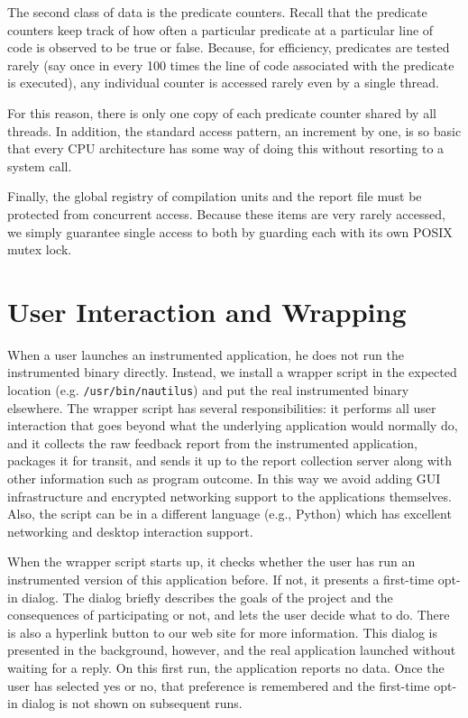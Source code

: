 \documentclass[times,10pt,twocolumn]{article}
\begin{document}
The second class of data is the predicate counters.
Recall that the  predicate counters keep track of how often a particular
predicate at a particular line of code is observed to be true or false.
Because, for efficiency,  predicates are tested rarely (say once in every 100
times the line of code associated with the predicate is executed), 
any individual counter is accessed rarely even by a single thread.

For this reason, there is only one copy of each predicate counter
shared by all threads.  In addition, the standard access pattern, an
increment by one, is so basic that every CPU architecture has
some way of doing this without resorting to a system call.

Finally, the global registry of compilation units and the report file
must be protected from concurrent access.  Because these items are very
rarely accessed, we simply guarantee single access to both by guarding
each with its own POSIX mutex lock.


\section{User Interaction and Wrapping}

When a user launches an instrumented application, he does not run the
instrumented binary directly.  Instead, we install a wrapper script in
the expected location (e.g. \texttt{/usr/bin/nautilus}) and put the
real instrumented binary elsewhere.  The wrapper script has several
responsibilities:  it performs all user interaction
that goes beyond what the underlying application would normally do, and
it collects the raw feedback report from the instrumented
application, packages it for transit, and sends it up to the report
collection server along with other information such as program
outcome.  In this way we avoid adding GUI infrastructure and
encrypted networking support to the applications themselves.
Also, the script can be in a different language (e.g., Python)
which has excellent networking and desktop interaction support.

When the wrapper script starts up, it checks whether the user has run
an instrumented version of this application before.  If not, it
presents a first-time opt-in dialog.  The dialog briefly describes the
goals of the project and the consequences of participating or not, and
lets the user decide what to do.  There is also a hyperlink button to
our web site for more information.  This dialog is presented in the
background, however, and the real application launched without waiting
for a reply.  On this first run, the application 
reports no data.  
Once the user has selected yes or no, that preference is
remembered and the first-time opt-in dialog is not shown on subsequent
runs.
\end{document}

